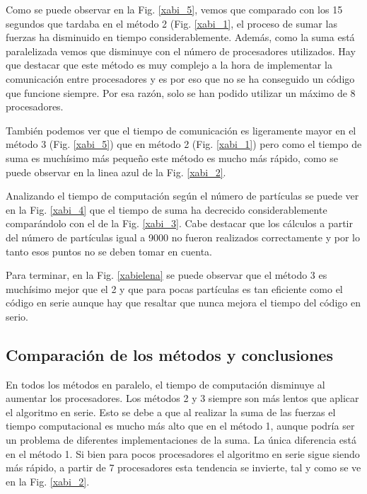 \documentclass[onecolumn]{article}
\begin{document}
Como se puede observar en la Fig. \ref{xabi_5}, vemos que comparado con los 15 segundos que tardaba en el método 2 (Fig. \ref{xabi_1}, el proceso de sumar las fuerzas ha disminuido en tiempo considerablemente. Además, como la suma está paralelizada vemos que disminuye con el número de procesadores utilizados. Hay que destacar que este método es muy complejo a la hora de implementar la comunicación entre procesadores y es por eso que no se ha conseguido un código que funcione siempre. Por esa razón, solo se han podido utilizar un máximo de 8 procesadores.

También podemos ver que el tiempo de comunicación es ligeramente mayor en el método 3 (Fig. \ref{xabi_5}) que en método 2 (Fig. \ref{xabi_1}) pero como el tiempo de suma es muchísimo más pequeño este método es mucho más rápido, como se puede observar en la linea azul de la Fig. \ref{xabi_2}.

Analizando el tiempo de computación según el número de partículas se puede ver en la Fig. \ref{xabi_4} que el tiempo de suma ha decrecido considerablemente comparándolo con el de la Fig. \ref{xabi_3}. Cabe destacar que los cálculos a partir del número de partículas igual a 9000 no fueron realizados correctamente y por lo tanto esos puntos no se deben tomar en cuenta.

Para terminar, en la Fig. \ref{xabielena} se puede observar que el método 3 es muchísimo mejor que el 2 y que para pocas partículas es tan eficiente como el código en serie aunque hay que resaltar que nunca mejora el tiempo del código en serio. 

\subsection{Comparación de los métodos y conclusiones}

En todos los métodos en paralelo, el tiempo de computación disminuye al aumentar los procesadores. Los métodos 2 y 3 siempre son más lentos que aplicar el algoritmo en serie. Esto se debe a que al realizar la suma de las fuerzas el tiempo computacional es mucho más alto que en el método 1, aunque podría ser un problema de diferentes implementaciones de la suma. La única diferencia está en el método 1. Si bien para pocos procesadores el algoritmo en serie sigue siendo más rápido, a partir de 7 procesadores esta tendencia se invierte, tal y como se ve en la Fig. \ref{xabi_2}.
\end{document}
